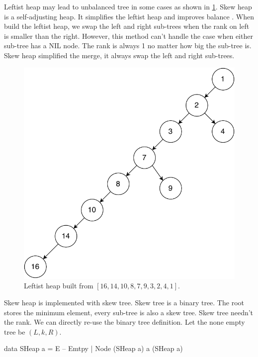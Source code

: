 \documentclass[b5paper]{article}
\begin{document}
Leftist heap may lead to unbalanced tree in some cases as shown in \cref{fig:unbalanced-leftist-tree}. Skew heap is a self-adjusting heap. It simplifies the leftist heap and improves balance\cite{wiki-skew-heap} \cite{self-adjusting-heaps}. When build the leftist heap, we swap the left and right sub-trees when the rank on left is smaller than the right. However, this method can't handle the case when either sub-tree has a NIL node. The rank is always 1 no matter how big the sub-tree is. Skew heap simplified the merge, it always swap the left and right sub-trees.

\begin{figure}[htbp]
  \centering
  \includegraphics[scale=0.45]{img/unbalanced-leftist-tree}
  \caption{Leftist heap built from $[16, 14, 10, 8, 7, 9, 3, 2, 4, 1]$.}
  \label{fig:unbalanced-leftist-tree}
\end{figure}

Skew heap is implemented with skew tree. Skew tree is a binary tree. The root stores the minimum element, every sub-tree is also a skew tree. Skew tree needn't the rank. We can directly re-use the binary tree definition. Let the none empty tree be $(L, k, R)$.

\begin{Haskell}
data SHeap a = E -- Emtpy
             | Node (SHeap a) a (SHeap a)
\end{Haskell}
\end{document}
